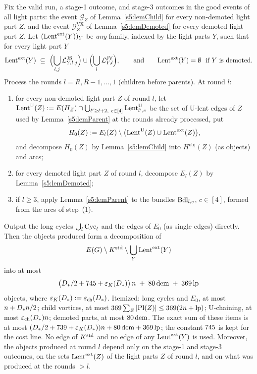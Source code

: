 \begin{lemma}\label{s5:lemKRED}
Fix the valid run, a stage-1 outcome, and stage-3 outcomes in the good events of all light parts: the event $\mathcal G_Z$ of Lemma~\ref{s5:lemChild} for every non-demoted light part $Z$, and the event $\mathcal G^{\mathrm{VX}}_Z$ of Lemma~\ref{s5:lemDemoted} for every demoted light part $Z$. Let $(\mathrm{Lent}^{\mathrm{ext}}(Y))_Y$ be \emph{any} family, indexed by the light parts $Y$, such that for every light part $Y$
\[
\Lentext(Y)\ \subseteq\ \Bigl(\bigcup_{l,j}\LJS_{Y,l,j}\Bigr)\cup\Bigl(\bigcup_l\LJV_{Y,l}\Bigr),\qquad\text{and}\qquad \Lentext(Y)=\emptyset\ \text{ if $Y$ is demoted.}
\]
Process the rounds $l=R,R-1,\dots,1$ (children before parents). At round $l$:
\begin{enumerate}
\item[(1)] for every non-demoted light part $Z$ of round $l$, let $\mathrm{Lent}^{\mathrm{U}}(Z)\mathrel{:=} E(H_Z)\cap\bigcup_{l'\ge l+2,\ c\in[4]}\mathrm{Lent}^{\mathrm{U}}_{l',c}$ be the set of U-lent edges of $Z$ used by Lemma~\ref{s5:lemParent} at the rounds already processed, put
\[
H_0(Z)\mathrel{:=} E_l(Z)\setminus\bigl(\mathrm{Lent}^{\mathrm{U}}(Z)\cup\mathrm{Lent}^{\mathrm{ext}}(Z)\bigr),
\]
and decompose $H_0(Z)$ by Lemma~\ref{s5:lemChild} into $H^{\mathrm{obj}}(Z)$ (as objects) and arcs;
\item[(2)] for every demoted light part $Z$ of round $l$, decompose $E_l(Z)$ by Lemma~\ref{s5:lemDemoted};
\item[(3)] if $l\ge3$, apply Lemma~\ref{s5:lemParent} to the bundles $\mathrm{Bdl}_{l,c}$, $c\in[4]$, formed from the arcs of step~(1).
\end{enumerate}
Output the long cycles $\bigcup_l\mathrm{Cyc}_l$ and the edges of $E_0$ (as single edges) directly. Then the objects produced form a decomposition of
\[
E(G)\setminus K^{\mathrm{std}}\setminus\bigcup_Y\mathrm{Lent}^{\mathrm{ext}}(Y)
\]
into at most
\[
\bigl(D_{*}/2+745+\varepsilon_{K}(D_{*})\bigr)\,n\;+\;80\,\mathrm{dem}\;+\;369\,\mathrm{lp}
\]
objects, where $\varepsilon_{K}(D_{*})\mathrel{:=}\varepsilon_{\mathrm{ch}}(D_{*})$. Itemized: long cycles and $E_0$, at most $n+D_{*} n/2$; child vortices, at most $369\sum_Z|\mathrm{Pl}(Z)|\le369(2n+\mathrm{lp})$; U-chaining, at most $\varepsilon_{\mathrm{ch}}(D_{*})n$; demoted parts, at most $80\,\mathrm{dem}$. The exact sum of these items is at most $(D_{*}/2+739+\varepsilon_{K}(D_{*}))n+80\,\mathrm{dem}+369\,\mathrm{lp}$; the constant $745$ is kept for the cost line. No edge of $K^{\mathrm{std}}$ and no edge of any $\mathrm{Lent}^{\mathrm{ext}}(Y)$ is used. Moreover, the objects produced at round $l$ depend only on the stage-1 and stage-3 outcomes, on the sets $\mathrm{Lent}^{\mathrm{ext}}(Z)$ of the light parts $Z$ of round $l$, and on what was produced at the rounds $>l$.
\deps{\ref{s5:lemChild}, \ref{s5:lemParent}, \ref{s5:lemDemoted}, \ref{s2:propStructure}, \ref{s2:propParentless}, \ref{s2:lemEL}, \ref{s3:defCOL}, \ref{s5:defStages}}
\end{lemma}

